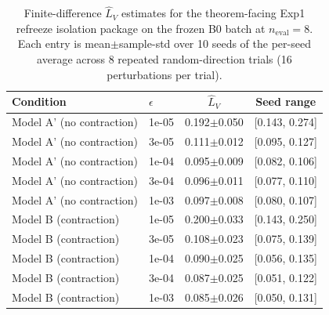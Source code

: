\begin{table}[t]
\centering
\caption{Finite-difference $\hat L_V$ estimates for the theorem-facing Exp1 refreeze isolation package on the frozen B0 batch at $n_{\mathrm{eval}}{=}8$. Each entry is mean$\pm$sample-std over 10 seeds of the per-seed average across 8 repeated random-direction trials (16 perturbations per trial).}
\label{tab:exp1_value_head_lipschitz}
\begin{tabular}{llcc}
\toprule
Condition & $\epsilon$ & $\hat L_V$ & Seed range \\
\midrule
  Model A' (no contraction) & 1e-05 & 0.192$\pm$0.050 & [0.143, 0.274] \\
  Model A' (no contraction) & 3e-05 & 0.111$\pm$0.012 & [0.095, 0.127] \\
  Model A' (no contraction) & 1e-04 & 0.095$\pm$0.009 & [0.082, 0.106] \\
  Model A' (no contraction) & 3e-04 & 0.096$\pm$0.011 & [0.077, 0.110] \\
  Model A' (no contraction) & 1e-03 & 0.097$\pm$0.008 & [0.080, 0.107] \\
  Model B (contraction) & 1e-05 & 0.200$\pm$0.033 & [0.143, 0.250] \\
  Model B (contraction) & 3e-05 & 0.108$\pm$0.023 & [0.075, 0.139] \\
  Model B (contraction) & 1e-04 & 0.090$\pm$0.025 & [0.056, 0.135] \\
  Model B (contraction) & 3e-04 & 0.087$\pm$0.025 & [0.051, 0.122] \\
  Model B (contraction) & 1e-03 & 0.085$\pm$0.026 & [0.050, 0.131] \\
\bottomrule
\end{tabular}
\end{table}